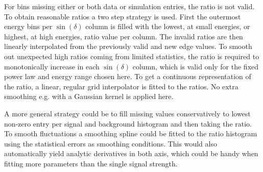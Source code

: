 
For bins missing either or both data or simulation entries, the ratio is not valid.
To obtain reasonable ratios a two step strategy is used.
First the outermost energy bins per $\sin(\delta)$ column is filled with the lowest, at small energies, or highest, at high energies, ratio value per column.
The invalid ratios are then linearly interpolated from the previously valid and new edge values.
To smooth out unexpected high ratios coming from limited statistics, the ratio is required to monotonically increase in each $\sin(\delta)$ column, which is valid only for the fixed power law and energy range chosen here.
To get a continuous representation of the ratio, a linear, regular grid interpolator is fitted to the ratios.
No extra smoothing e.g. with a Gaussian kernel is applied here.

A more general strategy could be to fill missing values conservatively to lowest non-zero entry per signal and background histogram and then taking the ratio.
To smooth fluctuations a smoothing spline could be fitted to the ratio histogram using the statistical errors as smoothing conditions.
This would also automatically yield analytic derivatives in both axis, which could be handy when fitting more parameters than the single signal strength.

